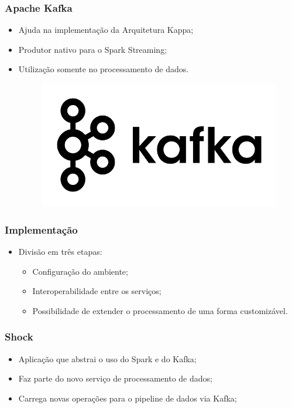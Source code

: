 \documentclass{beamer}
\begin{document}
  \begin{frame}
      \frametitle{Apache Kafka}
      \begin{itemize}
          \item Ajuda na implementação da Arquitetura Kappa;
          \item Produtor nativo para o Spark Streaming;
          \item Utilização somente no processamento de dados.
              \begin{figure}
                  \includegraphics[scale=0.3]{figures/kafka_logo.png}
              \end{figure}
      \end{itemize}
  \end{frame}

  \begin{frame}
      \frametitle{Implementação}
      \begin{itemize}
          \item Divisão em três etapas:
              \begin{itemize}
                  \item Configuração do ambiente;
                  \item Interoperabilidade entre os serviços;
                  \item Possibilidade de extender o processamento de uma forma customizável.
              \end{itemize}
      \end{itemize}
  \end{frame}

  \begin{frame}
      \frametitle{Shock}
      \begin{itemize}
          \item Aplicação que abstrai o uso do Spark e do Kafka;
          \item Faz parte do novo serviço de processamento de dados;
          \item Carrega novas operações para o pipeline de dados via Kafka;
      \end{itemize}
  \end{frame}
\end{document}
